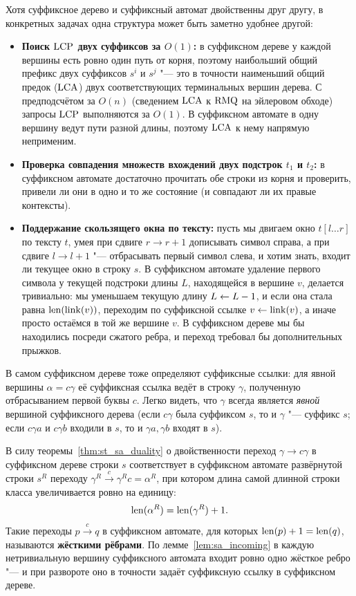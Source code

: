 Хотя суффиксное дерево и суффиксный автомат двойственны друг другу, в конкретных задачах одна структура может быть заметно удобнее другой:
\begin{itemize}
    \item \textbf{Поиск $\operatorname{LCP}$ двух суффиксов за $O(1)$:} в суффиксном дереве у каждой вершины есть ровно один путь от корня, поэтому наибольший общий префикс двух суффиксов $s^i$ и $s^j$ "--- это в точности наименьший общий предок ($\operatorname{LCA}$) двух соответствующих терминальных вершин дерева. С предподсчётом за $O(n)$ (сведением $\operatorname{LCA}$ к $\operatorname{RMQ}$ на эйлеровом обходе) запросы $\operatorname{LCP}$ выполняются за $O(1)$. В суффиксном автомате в одну вершину ведут пути разной длины, поэтому $\operatorname{LCA}$ к нему напрямую неприменим.
    \item \textbf{Проверка совпадения множеств вхождений двух подстрок $t_1$ и $t_2$:} в суффиксном автомате достаточно прочитать обе строки из корня и проверить, привели ли они в одно и то же состояние (и совпадают ли их правые контексты).
    \item \textbf{Поддержание скользящего окна по тексту:} пусть мы двигаем окно $t[l \dots r]$ по тексту $t$, умея при сдвиге $r \to r+1$ дописывать символ справа, а при сдвиге $l \to l+1$ "--- отбрасывать первый символ слева, и хотим знать, входит ли текущее окно в строку $s$. В суффиксном автомате удаление первого символа у текущей подстроки длины $L$, находящейся в вершине $v$, делается тривиально: мы уменьшаем текущую длину $L \leftarrow L - 1$, и если она стала равна $\operatorname{len}(\operatorname{link}(v))$, переходим по суффиксной ссылке $v \leftarrow \operatorname{link}(v)$, а иначе просто остаёмся в той же вершине $v$. В суффиксном дереве мы бы находились посреди сжатого ребра, и переход требовал бы дополнительных прыжков.
\end{itemize}

\begin{note}
    В самом суффиксном дереве тоже определяют суффиксные ссылки: для явной вершины $\alpha = c\gamma$ её суффиксная ссылка ведёт в строку $\gamma$, полученную отбрасыванием первой буквы $c$. Легко видеть, что $\gamma$ всегда является \emph{явной} вершиной суффиксного дерева (если $c\gamma$ была суффиксом $s$, то и $\gamma$ "--- суффикс $s$; если $c\gamma a$ и $c\gamma b$ входили в $s$, то и $\gamma a, \gamma b$ входят в $s$).

    В силу теоремы~\ref{thm:st_sa_duality} о двойственности переход $\gamma \to c\gamma$ в суффиксном дереве строки $s$ соответствует в суффиксном автомате развёрнутой строки $s^R$ переходу $\gamma^R \xrightarrow{c} \gamma^R c = \alpha^R$, при котором длина самой длинной строки класса увеличивается ровно на единицу:
    \[
        \operatorname{len}(\alpha^R) = \operatorname{len}(\gamma^R) + 1.
    \]
    Такие переходы $p \xrightarrow{c} q$ в суффиксном автомате, для которых $\operatorname{len}(p) + 1 = \operatorname{len}(q)$, называются \textbf{жёсткими рёбрами}. По лемме~\ref{lem:sa_incoming} в каждую нетривиальную вершину суффиксного автомата входит ровно одно жёсткое ребро "--- и при развороте оно в точности задаёт суффиксную ссылку в суффиксном дереве.
\end{note}

